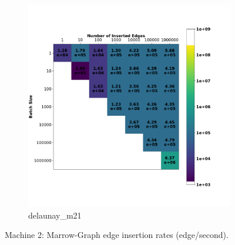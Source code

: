 \begin{figure}
\begin{subfigure}{0.5\textwidth}
        \includegraphics[width=\linewidth]{Chapters/Figures/plots/lmarrow-graph_edge_update_delaunay_n21_benchmark.pdf}
        \caption{delaunay\_m21}
    \end{subfigure}%
    \caption{Machine 2: Marrow-Graph edge insertion rates (edge/second).}
    \label{fig:lmarrow-graph_insertion_heat_plot}
\end{figure}

